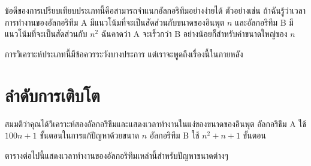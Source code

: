 
ข้อดีของการเปรียบเทียบประเภทนี้คือสามารถจำแนกอัลกอริทึมอย่างง่ายได้ ตัวอย่างเช่น 
ถ้าฉันรู้ว่าเวลาการทำงานของอัลกอริทึม A มีแนวโน้มที่จะเป็นสัดส่วนกับขนาดของอินพุต $n$ 
และอัลกอริทึม B มีแนวโน้มที่จะเป็นสัดส่วนกับ $n^2$ ฉันคาดว่า A จะเร็วกว่า B อย่างน้อยก็สำหรับค่าขนาดใหญ่ของ $n$


การวิเคราะห์ประเภทนี้มีข้อควรระวังบางประการ แต่เราจะพูดถึงเรื่องนี้ในภายหลัง


\section{ลำดับการเติบโต } %


สมมติว่าคุณได้วิเคราะห์สองอัลกอริธึมและแสดงเวลาทำงานในแง่ของขนาดของอินพุต
อัลกอริธึม A ใช้ $100n+1$ ขั้นตอนในการแก้ปัญหาด้วยขนาด $n$ อัลกอริทึม B ใช้ $n^2 + n + 1$ ขั้นตอน

ตารางต่อไปนี้แสดงเวลาทำงานของอัลกอริทึมเหล่านี้สำหรับปัญหาขนาดต่างๆ


